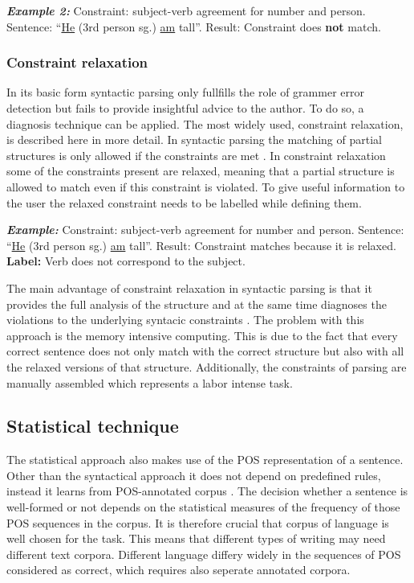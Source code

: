 \documentclass[runningheads]{llncs}
\begin{document}
\textbf{\textit{Example 2:}} Constraint: subject-verb agreement for number and person. Sentence: ``\underline{He} (3rd person sg.) \underline{am} tall''. Result: Constraint does \textbf{not} match.

\subsubsection{Constraint relaxation}
In its basic form syntactic parsing only fullfills the role of grammer error detection but fails to provide insightful advice to the author. To do so, a diagnosis technique can be applied. The most widely used, constraint relaxation, is described here in more detail. In syntactic parsing the matching of partial structures is only allowed if the constraints are met \citep{vandeventer_creating_2001}. In constraint relaxation some of the constraints present are relaxed, meaning that a partial structure is allowed to match even if this constraint is violated. To give useful information to the user the relaxed constraint needs to be labelled while defining them. 

\textbf{\textit{Example:}} Constraint: subject-verb agreement for number and person. Sentence: ``\underline{He} (3rd person sg.) \underline{am} tall''. Result: Constraint matches because it is relaxed. \textbf{Label:} Verb does not correspond to the subject.

The main advantage of constraint relaxation in syntactic parsing is that it provides the full analysis of the structure and at the same time diagnoses the violations to the underlying syntacic constraints \citep{vandeventer_creating_2001}. The problem with this approach is the memory intensive computing. This is due to the fact that every correct sentence does not only match with the correct structure but also with all the relaxed versions of that structure. Additionally, the constraints of parsing are manually assembled which represents a labor intense task. 

\subsection{Statistical technique}
The statistical approach also makes use of the POS representation of a sentence. Other than the syntactical approach it does not depend on predefined rules, instead it learns from POS-annotated corpus \citep{manchanda_various_2016}. The decision whether a sentence is well-formed or not depends on the statistical measures of the frequency of those POS sequences in the corpus. It is therefore crucial that corpus of language is well chosen for the task. This means that different types of writing may need different text corpora. Different language differy widely in the sequences of POS considered as correct, which requires also seperate annotated corpora.
\end{document}
